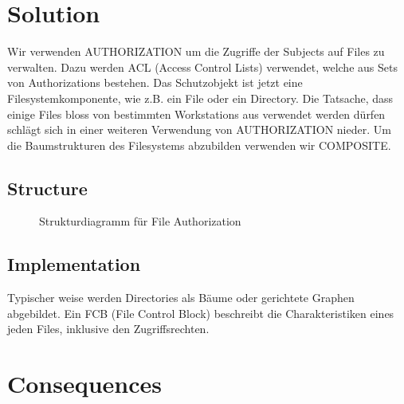 \section{Solution}
Wir verwenden AUTHORIZATION um die Zugriffe der Subjects auf Files zu verwalten. Dazu werden ACL (Access Control Lists) verwendet, welche aus Sets von Authorizations bestehen. Das Schutzobjekt ist jetzt eine Filesystemkomponente, wie z.B. ein File oder ein Directory. Die Tatsache, dass einige Files bloss von bestimmten Workstations aus verwendet werden dürfen schlägt sich in einer weiteren Verwendung von AUTHORIZATION nieder. Um die Baumstrukturen des Filesystems abzubilden verwenden wir COMPOSITE.

\subsection{Structure}
\begin{figure}[H]
  \centering
  
  \caption{Strukturdiagramm f\"ur File Authorization}
\end{figure}

\subsection{Implementation}
Typischer weise werden Directories als Bäume oder gerichtete Graphen abgebildet. Ein FCB (File Control Block) beschreibt die Charakteristiken eines jeden Files, inklusive den Zugriffsrechten.

\section{Consequences}
\begin{itemize}
\end{itemize}

